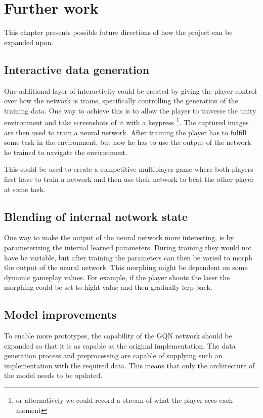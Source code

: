 
\chapter{Further work}
This chapter presents possible future directions of how the project can be expanded upon.


\section{Interactive data generation}
One additional layer of interactivity could be created by giving the player control over how the network is trains, specifically controlling the generation of the training data. One way to achieve this is to allow the player to traverse the unity environment and take screenshots of it with a keypress \footnote{or alternatively we could record a stream of what the player sees each moment}. The captured images are then used to train a neural network. After training the player has to fulfill some task in the environment, but now he has to use the output of the network he trained to navigate the environment.

This could be used to create a competitive multiplayer game where both players first have to train a network and then use their network to beat the other player at some task.


\section{Blending of internal network state}
One way to make the output of the neural network more interesting, is by parameterizing the internal learned parameters. During training they would not have be variable, but after training the parameters can then be varied to morph the output of the neural network. This morphing might be dependent on some dynamic gameplay values. For example, if the player shoots the laser the morphing could be set to hight value and then gradually lerp back.


\section{Model improvements}
To enable more prototypes, the capability of the GQN network should be expanded so that it is as capable as the original implementation. The data generation process and preprocessing are capable of supplying such an implementation with the required data. This means that only the architecture of the model needs to be updated.

